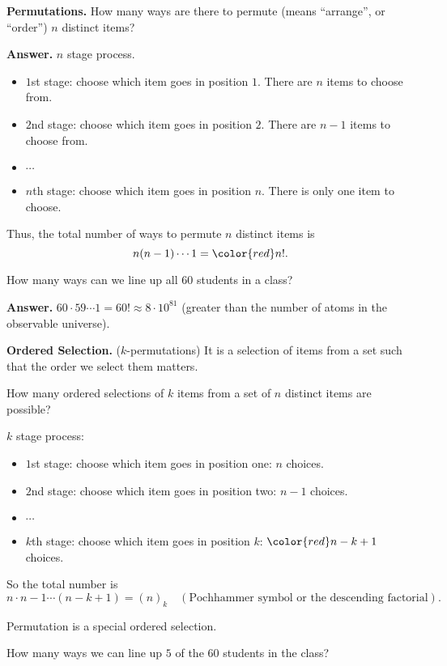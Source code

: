   \textbf{Permutations.} How many ways are there to permute (means ``arrange'',
  or ``order'') $n$ distinct items?

  \textbf{Answer.} $n$ stage process. 
  \begin{itemize}
  \item $1$st stage: choose which item goes in position $1$. There are $n$ items
    to choose from.
  \item $2$nd stage: choose which item goes in position $2$. There are $n-1$
    items to choose from.
  \item $\cdots$
  \item $n$th stage: choose which item goes in position $n$. There
    is only one item to choose.
  \end{itemize}
  Thus, the total number of ways to permute $n$ distinct items is
  \[
    n(n-1)\cdots 1 = {\color{red} n!}.
  \]

  \begin{example}
    How many ways can we line up all $60$ students in a class?
  \end{example}
  \textbf{Answer.} $60\cdot 59\cdots 1 = 60! \approx 8\cdot 10^{81}$ (greater
  than the number of atoms in the observable universe).

  \textbf{Ordered Selection.} ($k$-permutations) It is a selection of items from
  a set such that the order we select them matters.

  How many ordered selections of $k$ items from a set of $n$ distinct items are
  possible?

  $k$ stage process:
  \begin{itemize}
  \item $1$st stage: choose which item goes in position one: $n$ choices.
  \item $2$nd stage: choose which item goes in position two: $n-1$ choices.
  \item $\cdots$
  \item $k$th stage: choose which item goes in position $k$: ${\color{red}
      n-k+1} $ choices.
  \end{itemize}

  So the total number is
  \[
    n\cdot n-1\cdots (n-k+1) = (n)_k \quad(\text{Pochhammer symbol or the
      descending factorial}).
  \]

  \begin{remark}
   Permutation is a special ordered selection. 
  \end{remark}

  \begin{example}
    How many ways we can line up $5$ of the $60$ students in the class?
  \end{example}

